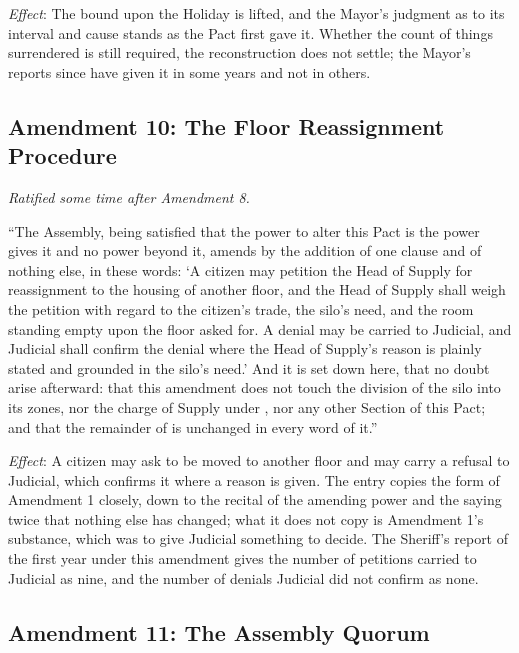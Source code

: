 \textit{Effect}: The bound upon the Holiday is lifted, and the Mayor's judgment as to its interval and cause stands as the Pact first gave it. Whether the count of things surrendered is still required, the reconstruction does not settle; the Mayor's reports since have given it in some years and not in others.

\subsection*{Amendment 10: The Floor Reassignment Procedure}

\textit{Ratified some time after Amendment 8.}

``The Assembly, being satisfied that the power to alter this Pact is the power  gives it and no power beyond it, amends  by the addition of one clause and of nothing else, in these words: `A citizen may petition the Head of Supply for reassignment to the housing of another floor, and the Head of Supply shall weigh the petition with regard to the citizen's trade, the silo's need, and the room standing empty upon the floor asked for. A denial may be carried to Judicial, and Judicial shall confirm the denial where the Head of Supply's reason is plainly stated and grounded in the silo's need.' And it is set down here, that no doubt arise afterward: that this amendment does not touch the division of the silo into its zones, nor the charge of Supply under , nor any other Section of this Pact; and that the remainder of  is unchanged in every word of it.''

\textit{Effect}: A citizen may ask to be moved to another floor and may carry a refusal to Judicial, which confirms it where a reason is given. The entry copies the form of Amendment 1 closely, down to the recital of the amending power and the saying twice that nothing else has changed; what it does not copy is Amendment 1's substance, which was to give Judicial something to decide. The Sheriff's report of the first year under this amendment gives the number of petitions carried to Judicial as nine, and the number of denials Judicial did not confirm as none.

\subsection*{Amendment 11: The Assembly Quorum}

